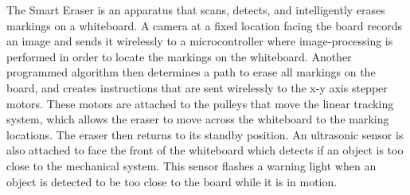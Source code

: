 The Smart Eraser is an apparatus that scans, detects, and intelligently erases markings on a whiteboard. A camera at a fixed location facing the board records an image and sends it wirelessly to a microcontroller where image-processing is performed in order to locate the markings on the whiteboard. Another programmed algorithm then determines a path to erase all markings on the board, and creates instructions that are sent wirelessly to the x-y axis stepper motors. These motors are attached to the pulleys that move the linear tracking system, which allows the eraser to move across the whiteboard to the marking locations. The eraser then returns to its standby position. An ultrasonic sensor is also attached to face the front of the whiteboard which detects if an object is too close to the mechanical system. This sensor flashes a warning light when an object is detected to be too close to the board while it is in motion.

 \newpage
 \thispagestyle{empty}
 \tableofcontents
 \newpage
 \listoffigures
 \thispagestyle{empty}
 \newpage
 \listoftables
 
 \newpage

